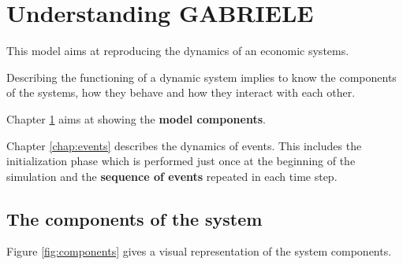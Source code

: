 \documentclass{book}
\begin{document}
\part{Understanding GABRIELE}

This model aims at reproducing the dynamics of an economic systems.

Describing the functioning of a dynamic system implies to know the components of the systems, how they behave and how they interact with each other. 


Chapter \ref{chap:components} aims at showing the \textbf{model components}.


Chapter \ref{chap:events} describes the dynamics of events. This includes the initialization phase which is performed just once at the beginning of the simulation and the \textbf{sequence of events} repeated in each time step.





\newpage

\chapter{The components of the system}\label{chap:components}

Figure \ref{fig:components} gives a visual representation of the system components.
\end{document}
